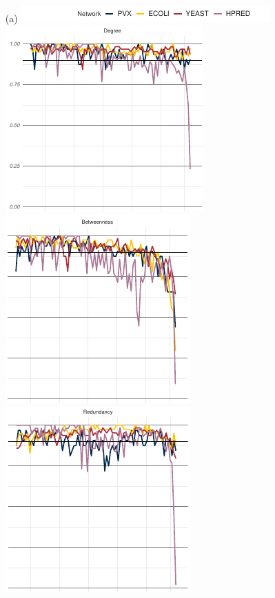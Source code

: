 \begin{figure}
    \begin{enumerate}
        \item[(a)] \includegraphics[scale=1.05]{plot_rank_similarity_papertop.pdf}\\
        \includegraphics[scale=1.05]{plot_rank_similarity_paper_degree.pdf}\hspace*{0.1mm}\includegraphics[scale=1.05]{plot_rank_similarity_paper_betweenness.pdf}\hspace*{-0.4mm}\includegraphics[scale=1.05]{plot_rank_similarity_paper_redundancy.pdf}\\

\end{enumerate}
\end{figure}

